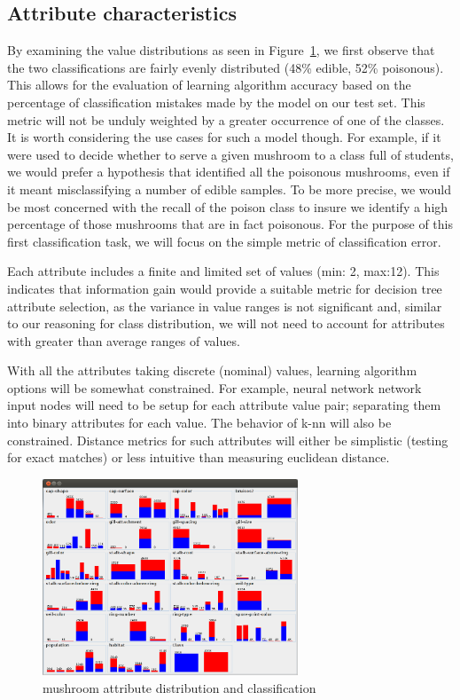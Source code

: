 \documentclass{sig-alternate}
\begin{document}
\subsection{Attribute characteristics}

By examining the value distributions as seen in Figure~\ref{ag-data-viz}, we first observe that the two classifications are fairly evenly distributed (48\% edible, 52\% poisonous). This allows for the evaluation of learning algorithm accuracy based on the percentage of classification mistakes made by the model on our test set. This metric will not be unduly weighted by a greater occurrence of one of the classes. It is worth considering the use cases for such a model though. For example, if it were used to decide whether to serve a given mushroom to a class full of students, we would prefer a hypothesis that identified all the poisonous mushrooms, even if it meant misclassifying a number of edible samples. To be more precise, we would be most concerned with the recall of the poison class to insure we identify a high percentage of those mushrooms that are in fact poisonous. For the purpose of this first classification task, we will focus on the simple metric of classification error.

Each attribute includes a finite and limited set of values (min: 2, max:12). This indicates that information gain would provide a suitable metric for decision tree attribute selection, as the variance in value ranges is not significant and, similar to our reasoning for class distribution, we will not need to account for attributes with greater than average ranges of values.

With all the attributes taking discrete (nominal) values, learning algorithm options will be somewhat constrained. For example, neural network network input nodes will need to be setup for each attribute value pair; separating them into binary attributes for each value. The behavior of k-nn will also be constrained. Distance metrics for such attributes will either be simplistic (testing for exact matches) or less intuitive than measuring euclidean distance.

\begin{figure}[!htbp]
    \centering
    \includegraphics[width=3in]{data/agaricus-lepiota/ag-data-viz.png}
    \caption{mushroom attribute distribution and classification \label{ag-data-viz}}
\end{figure} 
\end{document}
